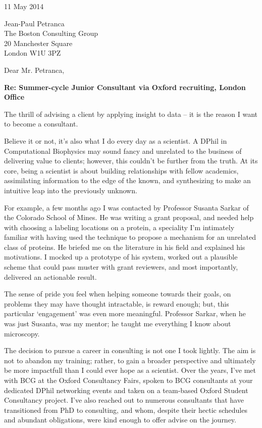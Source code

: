 \documentclass[a4paper]{../res}
\begin{document}
 
\begin{sloppypar}
 
%


\begin{resume} 
 
11 May 2014

Jean-Paul Petranca \\
The Boston Consulting Group \\
20 Manchester Square \\
London W1U 3PZ

Dear Mr. Petranca,

\textbf{Re: Summer-cycle Junior Consultant via Oxford recruiting, London Office}

The thrill of advising a client by applying insight to data -- it is the reason I want to become a consultant.

Believe it or not, it's also what I do every day as a scientist. A DPhil in Computational Biophysics may sound fancy and unrelated to the business of delivering value to clients; however, this couldn't be further from the truth. At its core, being a scientist is about building relationships with fellow academics, assimilating information to the edge of the known, and synthesizing to make an intuitive leap into the previously unknown.

For example, a few months ago I was contacted by Professor Susanta Sarkar of the Colorado School of Mines. He was writing a grant proposal, and needed help with choosing a labeling locations on a protein, a speciality I'm intimately familiar with having used the technique to propose a mechanism for an unrelated class of proteins. He briefed me on the literature in his field and explained his motivations. I mocked up a prototype of his system, worked out a plausible scheme that could pass muster with grant reviewers, and most importantly, delivered an actionable result.  

The sense of pride you feel when helping someone towards their goals, on problems they may have thought intractable, is reward enough; but, this particular `engagement' was even more meaningful. Professor Sarkar, when he was just Susanta, was my mentor; he taught me everything I know about microscopy.

The decision to pursue a career in consulting is not one I took lightly. The aim is not to abandon my training; rather, to gain a broader perspective and ultimately be more impactfull than I could ever hope as a scientist. Over the years, I've met with BCG at the Oxford Consultancy Fairs, spoken to BCG consultants at your dedicated DPhil networking events and taken on a team-based Oxford Student Consultancy project. I've also reached out to numerous consultants that have transitioned from PhD to consulting, and whom, despite their hectic schedules and abundant obligations, were kind enough to offer advise on the journey.


\end{resume}
\end{sloppypar}
\end{document}

